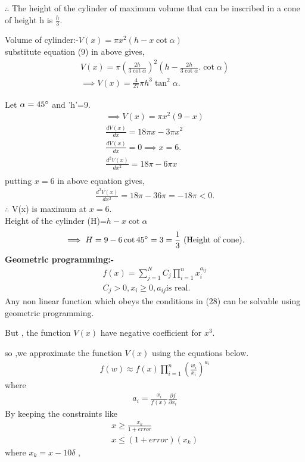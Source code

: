 \documentclass[10pt, a4paper]{article}
\begin{document}
$\therefore$ The height of the cylinder of maximum volume that can be inscribed in a cone of height h is $\frac{h}{3}$.

Volume of cylinder:-$V(x)=\pi x^2(h-x\cot\alpha)$\\


substitute equation (9) in above gives,
\begin{align}
V(x)=\pi \left(\frac{2h}{3\cot\alpha}\right)^2\left(h-\frac{2h}{3\cot\alpha}.\cot\alpha\right)\\
\implies V(x)=\frac{4}{27}\pi h^3\tan^2\alpha.
\end{align}

Let $\alpha=45\degree $ and 'h'=9.
\begin{align}
\implies V(x)=\pi x^2 (9-x)
\\ \frac{dV(x)}{dx}=18\pi x-3\pi x^2\\
\frac{dV(x)}{dx}=0 \implies x=6.\\
\frac{d^2V(x)}{dx^2}=18 \pi-6 \pi x\\
\end{align}
putting $x=6$ in above equation gives,
\begin{align}
\frac{d^2V(x)}{dx^2}=18\pi-36\pi=-18\pi <0.
\end{align}
$\therefore$ V(x) is maximum at $x=6$.\\
 Height of the cylinder (H)=$h-x\cot\alpha$\\
\begin{align}
\implies H=9-6\cot45\degree = 3 = \frac{1}{3}\text{ (Height of cone)}.
\end{align}
\textbf{Geometric programming:-}
\begin{align}
f(x)=\sum_{j=1}^{N} C_j  \prod_{i=1}^{n} x_i^{a_{ij}}\\
C_j >0 ,x_i\geq 0 ,a_{ij} \text{is real}.
\end{align}
Any non linear function which obeys the conditions in (28) can be solvable using geometric programming.
 
But , the function $V(x)$ have negative coefficient for $x^3$.

so ,we approximate the function $V(x)$ using the equations below.
\begin{align}
	f(w) \approx f(x)\prod_{i=1}^{n}\left({\frac{w_i}{x_i}}\right)^{a_i}
\end{align}
where
\begin{align}
	a_i = \frac{x_i}{f(x)}\frac{\partial{f}}{\partial{x_i}}
\end{align}
By keeping  the constraints like 
\begin{align}
x \geq \frac{x_k}{1+error}\\
x\leq (1+error)(x_k)
\end{align} 
where $x_k=x-10\delta$ ,
\end{document}
